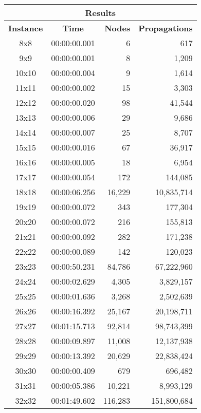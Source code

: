 
\begin{center}
    \begin{tabular}{|c|c|r|r|}
        \hline
        \multicolumn{4}{|c|}{\textbf{Results}} \\
        \hline
        \textbf{Instance} & \textbf{Time} & \textbf{Nodes} & \textbf{Propagations} \\
        
        \hline
		8x8 & 00:00:00.001 & 6 & 617 \\ \hline
		9x9 & 00:00:00.001 & 8 & 1,209 \\ \hline
		10x10 & 00:00:00.004 & 9 & 1,614 \\ \hline
		11x11 & 00:00:00.002 & 15 & 3,303 \\ \hline
		12x12 & 00:00:00.020 & 98 & 41,544 \\ \hline
		13x13 & 00:00:00.006 & 29 & 9,686 \\ \hline
		14x14 & 00:00:00.007 & 25 & 8,707 \\ \hline
		15x15 & 00:00:00.016 & 67 & 36,917 \\ \hline
		16x16 & 00:00:00.005 & 18 & 6,954 \\ \hline
		17x17 & 00:00:00.054 & 172 & 144,085 \\ \hline
		18x18 & 00:00:06.256 & 16,229 & 10,835,714 \\ \hline
		19x19 & 00:00:00.072 & 343 & 177,304 \\ \hline
		20x20 & 00:00:00.072 & 216 & 155,813 \\ \hline
		21x21 & 00:00:00.092 & 282 & 171,238 \\ \hline
		22x22 & 00:00:00.089 & 142 & 120,023 \\ \hline
		23x23 & 00:00:50.231 & 84,786 & 67,222,960 \\ \hline
		24x24 & 00:00:02.629 & 4,305 & 3,829,157 \\ \hline
		25x25 & 00:00:01.636 & 3,268 & 2,502,639 \\ \hline
		26x26 & 00:00:16.392 & 25,167 & 20,198,711 \\ \hline
		27x27 & 00:01:15.713 & 92,814 & 98,743,399 \\ \hline
		28x28 & 00:00:09.897 & 11,008 & 12,137,938 \\ \hline
		29x29 & 00:00:13.392 & 20,629 & 22,838,424 \\ \hline
		30x30 & 00:00:00.409 & 679 & 696,482 \\ \hline
		31x31 & 00:00:05.386 & 10,221 & 8,993,129 \\ \hline
		32x32 & 00:01:49.602 & 116,283 & 151,800,684 \\ \hline

\end{tabular}
\end{center}
